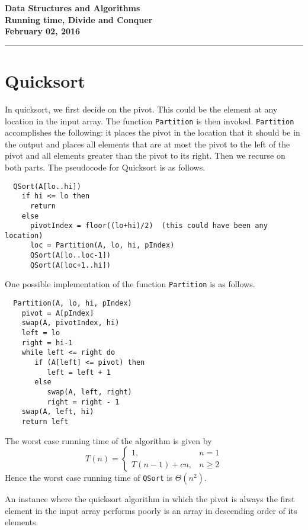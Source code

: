 \documentclass[11pt,twoside]{article}
\newcommand{\coursetitle}{Data Structures and Algorithms}
\newcommand{\docdate}{February 02, 2016}
\newcommand{\duedate}{February 02, 2016}
\newcommand{\doctitle}{Running time, Divide and Conquer}
\newcommand{\student}{PUT YOUR NAME HERE}
\begin{document}
\thispagestyle{empty}

\begin{center}
\Large\bf\coursetitle\\[2pt]\doctitle\\ \large\docdate
\end{center}
\vspace*{0.10in}

\hrule
\section*{Quicksort}
In quicksort, we first decide on the pivot. This could be the element
at any
location in the input array. The function \texttt{Partition} is then
invoked. \texttt{Partition} accomplishes the following: it places the
pivot in the location that it should be in the output and places all
elements that are at most the pivot to the left of the pivot and all
elements greater than the pivot to its right. Then we recurse on both
parts. The pseudocode for Quicksort is as follows.
\begin{verbatim}
  QSort(A[lo..hi])
    if hi <= lo then
      return
    else
      pivotIndex = floor((lo+hi)/2)  (this could have been any location)
      loc = Partition(A, lo, hi, pIndex)
      QSort(A[lo..loc-1])
      QSort(A[loc+1..hi])
\end{verbatim}

One possible implementation of the function \texttt{Partition} is as follows.
\begin{verbatim}
  Partition(A, lo, hi, pIndex)
    pivot = A[pIndex]
    swap(A, pivotIndex, hi)
    left = lo
    right = hi-1
    while left <= right do
       if (A[left] <= pivot) then
          left = left + 1
       else
          swap(A, left, right)
          right = right - 1
    swap(A, left, hi)
    return left
\end{verbatim}

The worst case running time of the algorithm is given by
\[
T(n) = \left\{ \begin{array}{ll}
       1, &  n=1\\
       T(n-1) + cn, &  n \geq 2
      \end{array} \right.
\]
Hence the worst case running time of \texttt{QSort} is $\Theta(n^2)$.

An instance where the quicksort algorithm in which the pivot is
always the first element in the input array performs poorly is an
array in descending order of its elements.
\end{document}
